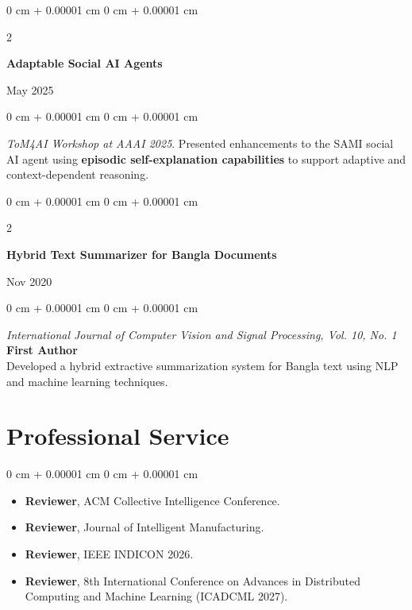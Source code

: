 \documentclass[10pt, letterpaper]{article}
\newenvironment{highlights}{
    \begin{itemize}[
        topsep=0.10 cm,
        parsep=0.10 cm,
        partopsep=0pt,
        itemsep=0pt,
        leftmargin=0 cm + 10pt
    ]
}{
    \end{itemize}
}
\newenvironment{onecolentry}{
    \begin{adjustwidth}{
        0 cm + 0.00001 cm
    }{
        0 cm + 0.00001 cm
    }
}{
    \end{adjustwidth}
}
\newenvironment{twocolentry}[2][]{
    \onecolentry
    \def\secondColumn{#2}
    \setcolumnwidth{\fill, 4.5 cm}
    \begin{paracol}{2}
}{
    \switchcolumn \raggedleft \secondColumn
    \end{paracol}
    \endonecolentry
}
\begin{document}
\vspace{0.2 cm}

\begin{twocolentry}{May 2025}
\textbf{Adaptable Social AI Agents}
\end{twocolentry}

\begin{onecolentry}
\textit{ToM4AI Workshop at AAAI 2025}. Presented enhancements to the SAMI social AI agent using \textbf{episodic self-explanation capabilities} to support adaptive and context-dependent reasoning.
\end{onecolentry}

\vspace{0.2 cm}

\begin{twocolentry}{Nov 2020}
\textbf{Hybrid Text Summarizer for Bangla Documents}
\end{twocolentry}

\begin{onecolentry}
\textit{International Journal of Computer Vision and Signal Processing, Vol. 10, No. 1} \quad \textbf{First Author} \\
Developed a hybrid extractive summarization system for Bangla text using NLP and machine learning techniques.
\end{onecolentry}

\section{Professional Service}

\begin{onecolentry}
\begin{highlights}

\item \textbf{Reviewer}, ACM Collective Intelligence Conference.

\item \textbf{Reviewer}, Journal of Intelligent Manufacturing.

\item \textbf{Reviewer}, IEEE INDICON 2026.

\item \textbf{Reviewer}, 8th International Conference on Advances in Distributed Computing and Machine Learning (ICADCML 2027).
\end{highlights}
\end{onecolentry}
\end{document}
